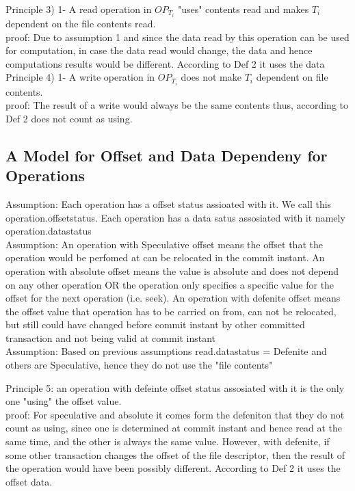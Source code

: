 \documentclass[a4paper, 11pt]{article}
\begin{document}
Principle 3) 1- A read operation in $OP_{T_i}$ "uses" contents read and makes $T_i$ dependent on the file contents read.\\

proof: Due to assumption 1 and since the data read by this operation can be used for computation, in case the data read would change, the data and hence computations results would be different. According to Def 2 it uses the data\\

Principle 4) 1- A write operation in $OP_{T_i}$ does not make $T_i$ dependent on file contents.\\   

proof: The result of a write would always be the same contents thus, according to Def 2 does not count as using.\\

\subsection{A Model for Offset and Data Dependeny for Operations}

Assumption: Each operation has a offset status assioated with it. We call this operation.offsetstatus. Each operation has a data satus assosiated with it namely operation.datastatus\\

Assumption:  An operation with Speculative offset means the offset that the operation would be perfomed at can be relocated in the commit instant. An operation with absolute offset means the value is absolute and does not depend on any other operation OR the operation only specifies a specific value for the offset for the next operation (i.e. seek). An operation with defenite offset means the offset value that operation has to be carried on from, can not be relocated, but still could have changed before commit instant by other committed transaction and not being valid at commit instant\\

Assumption: Based on previous assumptions read.datastatus = Defenite and others are Speculative, hence they do not use the "file contents"

Principle 5: an operation with defeinte offset status assosiated with it is the only one "using" the offset value.\\

proof: For speculative and absolute it comes form the defeniton that they do not count as using, since one is determined at commit instant and hence read at the same time, and the other is always the same value. However, with defenite, if some other transaction changes the offset of the file descriptor, then the result of the operation would have been possibly different. According to Def 2 it uses the offset data.\\ 
\end{document}
